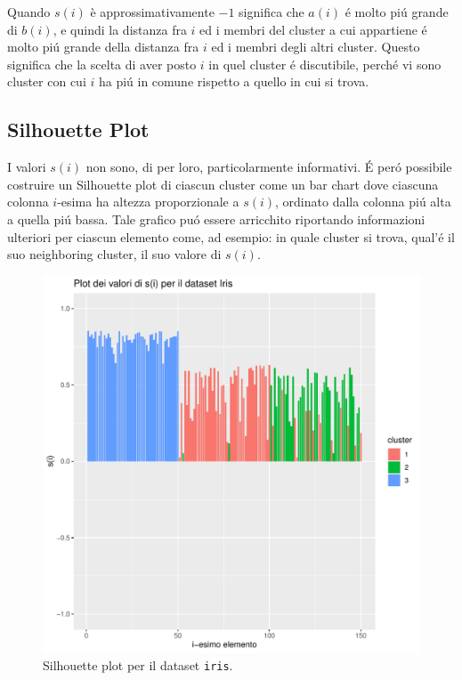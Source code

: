 \documentclass[italian]{article}
\begin{document}
		Quando $s(i)$ è approssimativamente $-1$ significa che $a(i)$ é molto
		piú grande di $b(i)$, e quindi la distanza fra $i$ ed i membri del
		cluster a cui appartiene é molto piú grande della distanza fra $i$
		ed i membri degli altri cluster. Questo significa che la scelta di
		aver posto $i$ in quel cluster é discutibile, perché vi sono cluster
		con cui $i$ ha piú in comune rispetto a quello in cui si trova.


	\subsection{Silhouette Plot}

		I valori $s(i)$ non sono, di per loro, particolarmente informativi.
		É peró possibile costruire un Silhouette plot di ciascun cluster
		come un bar chart dove ciascuna colonna $i$-esima ha altezza
		proporzionale a $s(i)$, ordinato dalla colonna piú alta a quella
		piú bassa. Tale grafico puó essere arricchito riportando informazioni
		ulteriori per ciascun elemento come, ad esempio: in quale cluster si
		trova, qual'é il suo neighboring cluster, il suo valore di $s(i)$.

		\begin{figure}
			\includegraphics[width = \textwidth]{doc/si.pdf}
			\caption{Silhouette plot per il dataset \texttt{iris}.}
			\label{fig:si}
		\end{figure}
\end{document}
